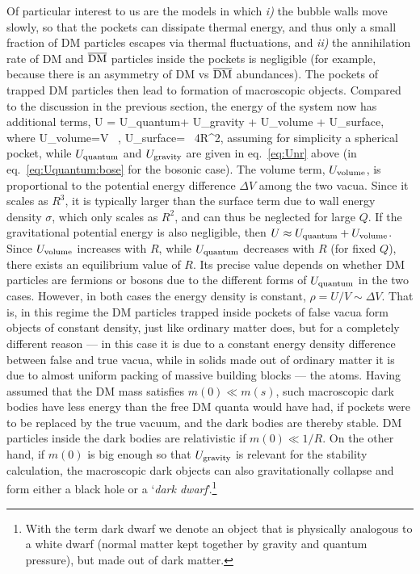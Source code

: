 Of particular interest to us are the models in which {\em i)} the bubble walls move slowly, so that the pockets can dissipate thermal energy, and thus only a small fraction of DM particles escapes via thermal fluctuations, and {\em ii)} the annihilation rate of DM and $\overline{\rm DM}$ particles inside the pockets is negligible (for example, because there is an asymmetry of DM vs $\overline{\rm DM}$ abundances). 
The pockets of trapped DM particles then lead to formation of macroscopic objects.
Compared to the discussion in the previous section, the energy of the system now has additional terms,
\beq \label{eq:UmacroDM}
U = U_{\rm quantum}+ U_{\rm gravity}
 + U_{\rm volume} + U_{\rm surface},
 \eeq
 where
 \beq
 U_{\rm volume}=\Delta V \,  ,\qquad
 U_{\rm surface}= \sigma \, 4\pi  R^2,
\eeq
assuming for simplicity a spherical pocket, 
while $U_{\rm quantum}$ and  $U_{\rm gravity}$ are given in eq.~\eqref{eq:Unr} above (in eq.~\eqref{eq:Uquantum:bose} for the bosonic case).
The volume term, $U_{\rm volume}$, is proportional to the potential energy difference $\Delta V$ among the two vacua. Since it scales as $R^3$, it is typically larger than the surface  term due to wall energy density $\sigma$, which only scales as $R^2$, and can thus be neglected for large $Q$.
If the gravitational potential energy is also negligible, then $U \approx  U_{\rm quantum}+ U_{\rm volume}$. 
Since $U_{\rm volume}$ increases with $R$, while $U_{\rm quantum}$ decreases with $R$ (for fixed $Q$), there exists an equilibrium value of $R$.
Its precise value depends on whether DM particles are fermions or bosons due to the different forms of $U_{\rm quantum}$ in the two cases. 
However, in both cases the energy density is constant, $\rho =U/V\sim \Delta V$. That is, in this regime the DM particles trapped inside pockets of false vacua form objects of constant density, just like ordinary matter does, but for a completely different reason --- in this case it is due to a constant energy density difference between false and true vacua, while in solids made out of ordinary matter it is due to almost uniform packing of massive building blocks --- the atoms. 
Having assumed that the DM mass satisfies $m(0) \ll m(s)$, such macroscopic dark bodies have less energy than the free DM quanta would have had, 
if pockets were to be replaced by the true vacuum, and the dark bodies are thereby stable.
DM particles inside the dark bodies are relativistic if $m(0) \ll 1/R$.
On the other hand, if $m(0)$ is big enough so that $U_{\rm gravity}$ is relevant for the stability calculation, 
the macroscopic dark objects can also gravitationally collapse and form either a black hole or a `{\em dark dwarf}'.\footnote{
With the term dark dwarf we denote an object that is physically analogous to a white dwarf 
(normal matter kept together by gravity and quantum pressure),
but made out of dark matter.}


